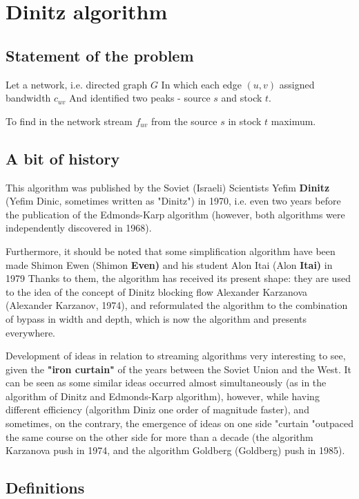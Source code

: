 \section{ Dinitz algorithm }
\subsection{ Statement of the problem }

Let a network, i.e. directed graph $G$ In which each edge $(u, v)$ assigned bandwidth $c_ {uv}$ And identified two peaks - source $s$ and stock $t$.

To find in the network stream $f_ {uv}$ from the source $s$ in stock $t$ maximum.

\subsection{ A bit of history }

This algorithm was published by the Soviet (Israeli) Scientists Yefim \textbf{Dinitz} (Yefim Dinic, sometimes written as "Dinitz") in 1970, i.e. even two years before the publication of the Edmonds-Karp algorithm (however, both algorithms were independently discovered in 1968).

Furthermore, it should be noted that some simplification algorithm have been made ​​Shimon Ewen (Shimon \textbf{Even)} and his student Alon Itai (Alon \textbf{Itai)} in 1979 Thanks to them, the algorithm has received its present shape: they are used to the idea of the concept of Dinitz blocking flow Alexander Karzanova (Alexander Karzanov, 1974), and reformulated the algorithm to the combination of bypass in width and depth, which is now the algorithm and presents everywhere.

Development of ideas in relation to streaming algorithms very interesting to see, given the \textbf{"iron curtain"} of the years between the Soviet Union and the West. It can be seen as some similar ideas occurred almost simultaneously (as in the algorithm of Dinitz and Edmonds-Karp algorithm), however, while having different efficiency (algorithm Diniz one order of magnitude faster), and sometimes, on the contrary, the emergence of ideas on one side "curtain "outpaced the same course on the other side for more than a decade (the algorithm Karzanova push in 1974, and the algorithm Goldberg (Goldberg) push in 1985).

\subsection{ Definitions }

